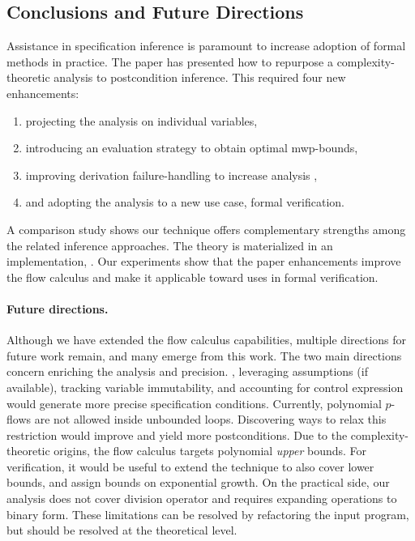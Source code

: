 \subsection{Conclusions and Future Directions}
\label{sec:pc-conclusion}

Assistance in specification inference is paramount to increase adoption of formal methods in practice.
The paper has presented how to repurpose a complexity-theoretic analysis to postcondition inference.
This required four new enhancements:

\begin{enumerate}[label=(\roman*)]
\item projecting the analysis on individual variables,
\item introducing an evaluation strategy to obtain optimal mwp-bounds,
\item improving derivation failure-handling to increase analysis ,
\item and adopting the analysis to a new use case, \ie formal verification.
\end{enumerate}

A comparison study shows our technique offers complementary strengths among the related inference approaches.
The theory is materialized in an implementation, \ndx{\impl}.
Our experiments show that the paper enhancements improve the flow calculus and make it applicable toward uses in formal verification.

\paragraph*{Future directions.}
Although we have extended the flow calculus capabilities, multiple directions for future work remain, and many emerge from this work.
The two main directions concern enriching the analysis  and precision.
\Eg, leveraging assumptions (if available), tracking variable immutability, and accounting for control expression would generate more precise specification conditions.
Currently, polynomial \(p\)-flows are not allowed inside unbounded loops.
Discovering ways to relax this restriction would improve  and yield more postconditions.
Due to the complexity-theoretic origins, the flow calculus targets polynomial \emph{upper} bounds.
For verification, it would be useful to extend the technique to also cover lower bounds, and assign bounds on exponential growth.
On the practical side, our analysis does not cover division operator and requires expanding operations to binary form.
These limitations can be resolved by refactoring the input program, but should be resolved at the theoretical level.

